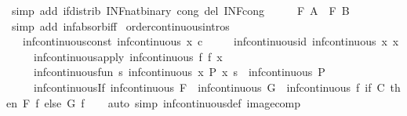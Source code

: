 \begin{isabellebody}
\ {\isacharparenleft}simp\ add{\isacharcolon}\ if{\isacharunderscore}distrib\ INF{\isacharunderscore}nat{\isacharunderscore}binary\ cong\ del{\isacharcolon}\ INF{\isacharunderscore}cong{\isacharparenright}\isanewline
\ \ \isamarkupfalse%
\ \isamarkupfalse%
\ {\isachardoublequoteopen}F\ A\ {\isasymle}\ F\ B{\isachardoublequoteclose}\isanewline
\ \ \ \ \isamarkupfalse%
\ {\isacharparenleft}simp\ add{\isacharcolon}\ inf{\isachardot}absorb{\isacharunderscore}iff{}{\isacharparenright}\isanewline
{}\isamarkupfalse%
%
\endisatagproof
{\isafoldproof}%
%
\isadelimproof
\isanewline
%
\endisadelimproof
\isanewline
{}\isamarkupfalse%
\ {\isacharbrackleft}order{\isacharunderscore}continuous{\isacharunderscore}intros{\isacharbrackright}{\isacharcolon}\isanewline
\ \ \ inf{\isacharunderscore}continuous{\isacharunderscore}const{\isacharcolon}\ {\isachardoublequoteopen}inf{\isacharunderscore}continuous\ {\isacharparenleft}{\isasymlambda}x{\isachardot}\ c{\isacharparenright}{\isachardoublequoteclose}\isanewline
\ \ \ \ \ inf{\isacharunderscore}continuous{\isacharunderscore}id{\isacharcolon}\ {\isachardoublequoteopen}inf{\isacharunderscore}continuous\ {\isacharparenleft}{\isasymlambda}x{\isachardot}\ x{\isacharparenright}{\isachardoublequoteclose}\isanewline
\ \ \ \ \ inf{\isacharunderscore}continuous{\isacharunderscore}apply{\isacharcolon}\ {\isachardoublequoteopen}inf{\isacharunderscore}continuous\ {\isacharparenleft}{\isasymlambda}f{\isachardot}\ f\ x{\isacharparenright}{\isachardoublequoteclose}\isanewline
\ \ \ \ \ inf{\isacharunderscore}continuous{\isacharunderscore}fun{\isacharcolon}\ {\isachardoublequoteopen}{\isacharparenleft}{\isasymAnd}s{\isachardot}\ inf{\isacharunderscore}continuous\ {\isacharparenleft}{\isasymlambda}x{\isachardot}\ P\ x\ s{\isacharparenright}{\isacharparenright}\ {\isasymLongrightarrow}\ inf{\isacharunderscore}continuous\ P{\isachardoublequoteclose}\isanewline
\ \ \ \ \ inf{\isacharunderscore}continuous{\isacharunderscore}If{\isacharcolon}\ {\isachardoublequoteopen}inf{\isacharunderscore}continuous\ F\ {\isasymLongrightarrow}\ inf{\isacharunderscore}continuous\ G\ {\isasymLongrightarrow}\ inf{\isacharunderscore}continuous\ {\isacharparenleft}{\isasymlambda}f{\isachardot}\ if\ C\ then\ F\ f\ else\ G\ f{\isacharparenright}{\isachardoublequoteclose}\isanewline
%
\isadelimproof
\ \ %
\endisadelimproof
%
\isatagproof
{}\isamarkupfalse%
\ {\isacharparenleft}auto\ simp{\isacharcolon}\ inf{\isacharunderscore}continuous{\isacharunderscore}def\ image{\isacharunderscore}comp{\isacharparenright}%

\end{isabellebody}

